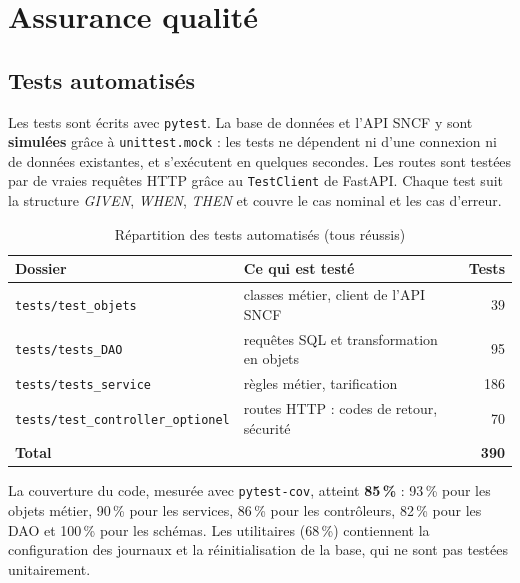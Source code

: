 \documentclass[11pt,a4paper]{article}
\newcommand{\code}[1]{\texttt{#1}}
\begin{document}
\section{Assurance qualité}\label{sec:qualite}

\subsection{Tests automatisés}

Les tests sont écrits avec \code{pytest}. La base de données et l'API SNCF y sont
\textbf{simulées} grâce à \code{unittest.mock} : les tests ne dépendent ni d'une connexion ni de
données existantes, et
s'exécutent en quelques secondes. Les routes sont testées par de vraies requêtes HTTP grâce au
\code{TestClient} de FastAPI. Chaque test suit la structure \emph{GIVEN}, \emph{WHEN},
\emph{THEN} et couvre le cas nominal et les cas d'erreur.

\begin{table}[H]
\centering\small
\begin{tabular}{@{}l l r@{}}
\toprule
\textbf{Dossier} & \textbf{Ce qui est testé} & \textbf{Tests} \\
\midrule
\code{tests/test\_objets}              & classes métier, client de l'API SNCF          &  39 \\
\code{tests/tests\_DAO}                & requêtes SQL et transformation en objets      &  95 \\
\code{tests/tests\_service}            & règles métier, tarification                   & 186 \\
\code{tests/test\_controller\_optionel}& routes HTTP : codes de retour, sécurité       &  70 \\
\midrule
\textbf{Total}                         &                                                & \textbf{390} \\
\bottomrule
\end{tabular}
\caption{Répartition des tests automatisés (tous réussis)}
\end{table}

La couverture du code, mesurée avec \code{pytest-cov}, atteint \textbf{85\,\%} : 93\,\% pour les
objets métier, 90\,\% pour les services, 86\,\% pour les contrôleurs, 82\,\% pour les DAO et
100\,\% pour les schémas. Les utilitaires (68\,\%) contiennent la configuration des journaux et la
réinitialisation de la base, qui ne sont pas testées unitairement.
\end{document}
